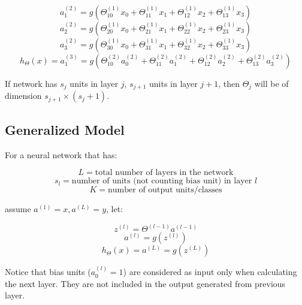\documentclass{article}
\begin{document}
\bigskip

\[a_1^{(2)} = g(\Theta_{10}^{(1)} x_0 + \Theta_{11}^{(1)} x_1 + \Theta_{12}^{(1)} x_2 + \Theta_{13}^{(1)} x_3)\]
\[a_2^{(2)} = g(\Theta_{20}^{(1)} x_0 + \Theta_{21}^{(1)} x_1 + \Theta_{22}^{(1)} x_2 + \Theta_{23}^{(1)} x_3)\]
\[a_3^{(2)} = g(\Theta_{30}^{(1)} x_0 + \Theta_{31}^{(1)} x_1 + \Theta_{32}^{(1)} x_2 + \Theta_{33}^{(1)} x_3)\]
\[h_{\Theta}(x) = a_1^{(3)} = g(\Theta_{10}^{(2)} a_0^{(2)} + \Theta_{11}^{(2)} a_1^{(2)} + \Theta_{12}^{(2)} a_2^{(2)} + \Theta_{13}^{(2)} a_3^{(2)})\]

\bigskip

\noindent If network has \(s_j\) units in layer \(j\), \(s_{j + 1}\) units in layer \(j + 1\), then \(\Theta_j\) will be of dimension \(s_{j + 1} \times (s_j + 1)\).

\subsection{Generalized Model}

\noindent For a neural network that has:

\[L = \text{total number of layers in the network}\]
\[s_l = \text{number of units (not counting bias unit) in layer } l\]
\[K = \text{number of output units/classes}\]

\noindent assume \(a^{(1)} = x, a^{(L)} = y\), let:

\[z^{(l)} = \Theta^{(l - 1)} a^{(l - 1)}\]
\[a^{(l)} = g(z^{(l)})\]
\[h_\Theta(x) = a^{(L)} = g(z^{(L)})\]

\noindent Notice that bias units (\(a_0^{(l)} = 1\)) are considered as input only when calculating the next layer. They are not included in the output generated from previous layer.

\printindex
\end{document}
